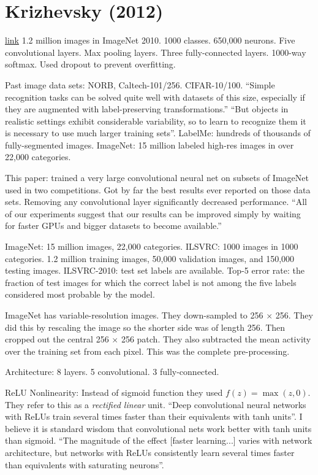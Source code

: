 \documentclass[12pt]{report}
\newcommand{\link}[2]{\href{#1}{#2}}
\begin{document}
\section{Krizhevsky (2012)}

\link{http://www.cs.toronto.edu/\~hinton/absps/imagenet.pdf}{link} 1.2
million images in ImageNet 2010.  1000 classes.  650,000 neurons.
Five convolutional layers.  Max pooling layers.  Three fully-connected
layers.  1000-way softmax.  Used dropout to prevent overfitting.

Past image data sets: NORB, Caltech-101/256. CIFAR-10/100.  ``Simple
recognition tasks can be solved quite well with datasets of this size,
especially if they are augmented with label-preserving
transformations.''  ``But objects in realistic settings exhibit
considerable variability, so to learn to recognize them it is
necessary to use much larger training sets''.  LabelMe: hundreds of
thousands of fully-segmented images.  ImageNet: 15 million labeled
high-res images in over 22,000 categories.

This paper: trained a very large convolutional neural net on subsets
of ImageNet used in two competitions.  Got by far the best results
ever reported on those data sets.  Removing any convolutional layer
significantly decreased performance.  ``All of our experiments suggest
that our results can be improved simply by waiting for faster GPUs and
bigger datasets to become available.''

ImageNet: 15 million images, 22,000 categories.  ILSVRC: 1000 images
in 1000 categories.  1.2 million training images, 50,000 validation
images, and 150,000 testing images.  ILSVRC-2010: test set labels are
available.  Top-5 error rate: the fraction of test images for which
the correct label is not among the five labels considered most
probable by the model.

ImageNet has variable-resolution images.  They down-sampled to 256
$\times$ 256.  They did this by rescaling the image so the shorter
side was of length 256.  Then cropped out the central 256 $\times$ 256
patch.  They also subtracted the mean activity over the training set
from each pixel.  This was the complete pre-processing.

Architecture: 8 layers.  5 convolutional.  3 fully-connected.

ReLU Nonlinearity: Instead of sigmoid function they used $f(z) =
\max(z, 0)$.  They refer to this as a \emph{rectified linear} unit.
``Deep convolutional neural networks with ReLUs train several times
faster than their equivalents with tanh units''.  I believe it is
standard wisdom that convolutional nets work better with tanh units
than sigmoid.  ``The magnitude of the effect [faster learning...]
varies with network architecture, but networks with ReLUs consistently
learn several times faster than equivalents with saturating neurons''.
\end{document}
